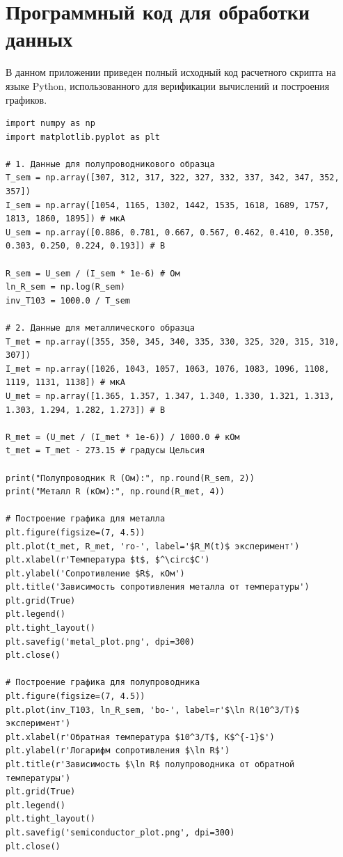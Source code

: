 \documentclass[12pt]{article}
\begin{document}
\newpage
\appendix
\section{Программный код для обработки данных}
В данном приложении приведен полный исходный код расчетного скрипта на языке Python, использованного для верификации вычислений и построения графиков.

\begin{lstlisting}[style=mypython, caption={Скрипт расчета параметров и графиков}]
import numpy as np
import matplotlib.pyplot as plt

# 1. Данные для полупроводникового образца
T_sem = np.array([307, 312, 317, 322, 327, 332, 337, 342, 347, 352, 357])
I_sem = np.array([1054, 1165, 1302, 1442, 1535, 1618, 1689, 1757, 1813, 1860, 1895]) # мкА
U_sem = np.array([0.886, 0.781, 0.667, 0.567, 0.462, 0.410, 0.350, 0.303, 0.250, 0.224, 0.193]) # В

R_sem = U_sem / (I_sem * 1e-6) # Ом
ln_R_sem = np.log(R_sem)
inv_T103 = 1000.0 / T_sem

# 2. Данные для металлического образца
T_met = np.array([355, 350, 345, 340, 335, 330, 325, 320, 315, 310, 307])
I_met = np.array([1026, 1043, 1057, 1063, 1076, 1083, 1096, 1108, 1119, 1131, 1138]) # мкА
U_met = np.array([1.365, 1.357, 1.347, 1.340, 1.330, 1.321, 1.313, 1.303, 1.294, 1.282, 1.273]) # В

R_met = (U_met / (I_met * 1e-6)) / 1000.0 # кОм
t_met = T_met - 273.15 # градусы Цельсия

print("Полупроводник R (Ом):", np.round(R_sem, 2))
print("Металл R (кОм):", np.round(R_met, 4))

# Построение графика для металла
plt.figure(figsize=(7, 4.5))
plt.plot(t_met, R_met, 'ro-', label='$R_M(t)$ эксперимент')
plt.xlabel(r'Температура $t$, $^\circ$C')
plt.ylabel('Сопротивление $R$, кОм')
plt.title('Зависимость сопротивления металла от температуры')
plt.grid(True)
plt.legend()
plt.tight_layout()
plt.savefig('metal_plot.png', dpi=300)
plt.close()

# Построение графика для полупроводника
plt.figure(figsize=(7, 4.5))
plt.plot(inv_T103, ln_R_sem, 'bo-', label=r'$\ln R(10^3/T)$ эксперимент')
plt.xlabel(r'Обратная температура $10^3/T$, K$^{-1}$')
plt.ylabel(r'Логарифм сопротивления $\ln R$')
plt.title(r'Зависимость $\ln R$ полупроводника от обратной температуры')
plt.grid(True)
plt.legend()
plt.tight_layout()
plt.savefig('semiconductor_plot.png', dpi=300)
plt.close()
\end{lstlisting}
\end{document}
